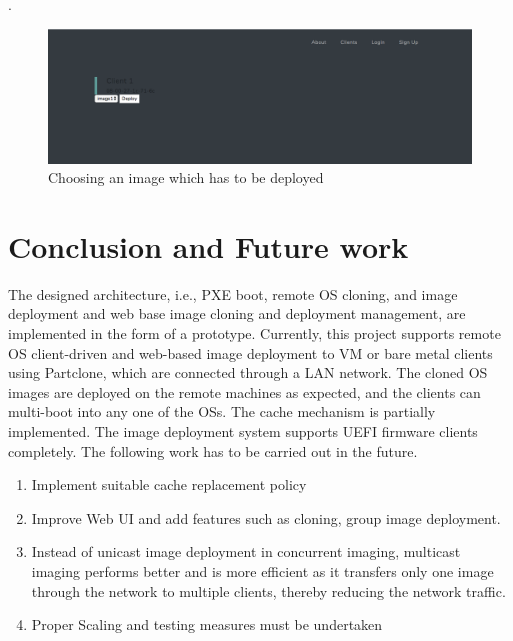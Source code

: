\documentclass[a4paper,12pt]{article}
\begin{document}
.
\newpage
\begin{figure}[h!]
    \centering
    \includegraphics[width=\linewidth]{webapp3.png}
    \caption{Choosing an image which has to be deployed}
    \label{task_image_deploy}
\end{figure}

\newpage
\section{\fontsize{16pt}{1em} Conclusion and Future work}
 The designed architecture, i.e., PXE boot, remote OS cloning, and image deployment and web base image cloning and deployment management, are implemented in the form of a prototype. Currently, this project supports remote OS client-driven and web-based image deployment to VM or bare metal clients using Partclone, which are connected through a LAN network. The cloned OS images are deployed on the remote machines as expected, and the clients can multi-boot into any one of the OSs. The cache mechanism is partially implemented. The image deployment system supports UEFI firmware clients completely. The following work has to be carried out in the future.
\begin{enumerate}
    \item Implement suitable cache replacement policy  
    \item Improve Web UI and add features such as cloning, group image deployment.
    \item Instead of unicast image deployment in concurrent imaging, multicast imaging performs better and is more efficient as it transfers only one image through the network to multiple clients, thereby reducing the network traffic.
    \item Proper Scaling and testing measures must be undertaken
\end{enumerate}
\end{document}
